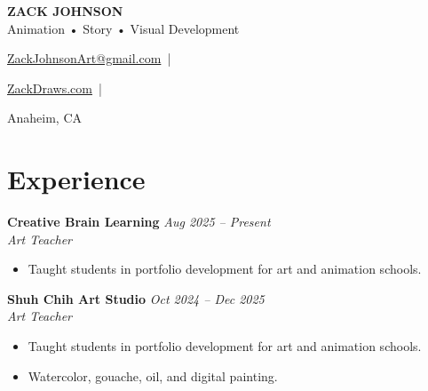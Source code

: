 \documentclass[11pt,letterpaper]{article}
\begin{document}
\raggedright






{\huge \textbf{ZACK JOHNSON}}\\[-2pt]

\large Animation • Story • Visual Development



\vspace{1pt}

\small

\href{mailto:ZackJohnsonArt@gmail.com}{ZackJohnsonArt@gmail.com} \,|\, 

\href{https://ZackDraws.com}{ZackDraws.com} \,|\, 

Anaheim, CA

\normalsize




\section{Experience}



\textbf{Creative Brain Learning} \hfill \textit{Aug 2025 -- Present}\\

\textit{Art Teacher}

\begin{itemize}

    \item Taught students in portfolio development for art and animation schools.

\end{itemize}



\textbf{Shuh Chih Art Studio} \hfill \textit{Oct 2024 -- Dec 2025}\\

\textit{Art Teacher}

\begin{itemize}

    \item Taught students in portfolio development for art and animation schools.

    \item Watercolor, gouache, oil, and digital painting.

\end{itemize}
\end{document}
